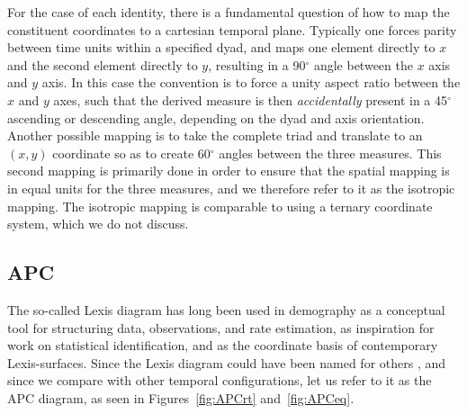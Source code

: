 \documentclass[11pt,oneside,a4paper]{article} %
\newcommand\tgh[1]{\raisebox{-.25\height}{\texttt{[image: Figures/triadtable/triad\#1.pdf]}}}
\begin{document}
For the case of each identity,
there is a fundamental question of how to map the constituent coordinates to a
cartesian temporal plane. Typically one forces parity between time units within
a specified dyad, and maps one element directly to $x$ and the second element
directly to $y$, resulting in a 90$^\circ$ angle between the $x$ axis and $y$
axis. In this case the convention is to force a unity aspect ratio
between the $x$ and $y$ axes, such that the derived measure is then
\textit{accidentally} present in a 45$^\circ$ ascending or descending angle,
depending on the dyad and axis orientation. Another possible mapping is to take
the complete triad and translate to an $(x,y)$ coordinate so as to create
60$^\circ$ angles between the three measures. This second mapping is primarily done in order to ensure that the spatial mapping is in equal units for the
three measures, and we therefore refer to it as the isotropic mapping.
The isotropic mapping is comparable to using a ternary coordinate system, which we
do not discuss.

\FloatBarrier
\subsection*{APC}%
The so-called Lexis diagram has long been used in demography as a conceptual
tool for structuring data, observations, and rate estimation, as inspiration for work
on statistical identification, and as the coordinate basis of contemporary
Lexis-surfaces.
Since the Lexis diagram could have been named for others
\citep{vandeschrick2001lexis,keiding2011age}, and since we compare with other
temporal configurations, let us refer to it as the APC diagram, as seen in
Figures~\ref{fig:APCrt} and~\ref{fig:APCeq}. 
\end{document}
